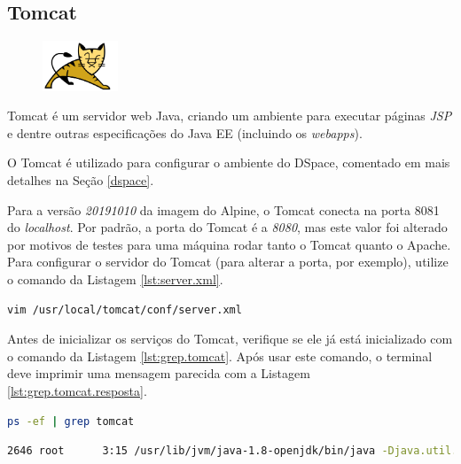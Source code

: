 \subsection{Tomcat}\label{tomcat}
\begin{figure} %
    \centering
    \includegraphics[width=0.2\textwidth]{../images/tomcat.png}
\end{figure}

Tomcat é um servidor web Java, criando um ambiente para executar páginas \textit{JSP} e dentre outras especificações do Java EE (incluindo os \textit{webapps}).

O Tomcat é utilizado para configurar o ambiente do DSpace, comentado em mais detalhes na Seção \ref{dspace}.

Para a versão \textit{20191010} da imagem do Alpine, o Tomcat conecta na porta 8081 do \textit{localhost}. Por padrão, a porta do Tomcat é a \textit{8080}, mas este valor foi alterado por motivos de testes para uma máquina rodar tanto o Tomcat quanto o Apache. Para configurar o servidor do Tomcat (para alterar a porta, por exemplo), utilize o comando da Listagem \ref{lst:server.xml}.

\begin{lstlisting}[language=bash, label=lst:server.xml, caption=Abrindo server.xml do Tomcat.]
    vim /usr/local/tomcat/conf/server.xml
\end{lstlisting}

Antes de inicializar os serviços do Tomcat, verifique se ele já está inicializado com o comando da Listagem \ref{lst:grep.tomcat}. Após usar este comando, o terminal deve imprimir uma mensagem parecida com a Listagem \ref{lst:grep.tomcat.resposta}.

\begin{lstlisting}[language=bash, label=lst:grep.tomcat, caption=Verificando se o TomCat está inicializado.]
    ps -ef | grep tomcat
\end{lstlisting}

\begin{lstlisting}[language=bash, breaklines=true, label=lst:grep.tomcat.resposta, caption=Parte de uma resposta de um Tomcat que já está rodando]
    2646 root      3:15 /usr/lib/jvm/java-1.8-openjdk/bin/java -Djava.util.logging.config.file=/usr/local/apache-tomcat-8.5.40/conf/logging.properties -Djava.util.logging.manager=org.apache.juli....
\end{lstlisting}

